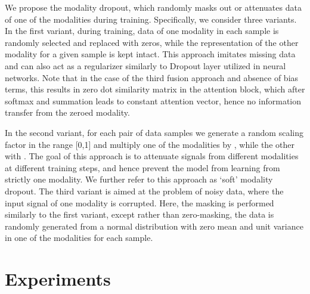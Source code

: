 \documentclass[a4paper,conference]{IEEEtran}
\begin{document}
We propose the modality dropout, which randomly masks out or attenuates data of one of the modalities during training. Specifically, we consider three variants. In the first variant, during training, data of one modality in each sample is randomly selected and replaced with zeros, while the representation of the other modality for a given sample is kept intact. This approach imitates missing data and can also act as a regularizer similarly to Dropout layer utilized in neural networks. Note that in the case of the third fusion approach and absence of bias terms, this results in zero dot similarity matrix in the attention block, which after softmax and summation leads to constant attention vector, hence no information transfer from the zeroed modality. 

In the second variant, for each pair of data samples we generate a random scaling factor  in the range [0,1] \cite{shen2017continuous} and multiply one of the modalities by , while the other with . The goal of this approach is to attenuate signals from different modalities at different training steps, and hence prevent the model from learning from strictly one modality. We further refer to this approach as `soft' modality dropout. The third variant is aimed at the problem of noisy data, where the input signal of one modality is corrupted. Here, the masking is performed similarly to the first variant, except rather than zero-masking, the data is randomly generated from a normal distribution with zero mean and unit variance in one of the modalities for each sample.

\section{Experiments}
\end{document}
